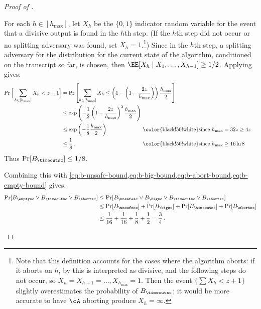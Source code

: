 \begin{itemize}
\begin{itemize}
\begin{proof}[Proof of ]
\begin{itemize}
\begin{itemize}[wide, font=\bfseries]
    For each $h \in [h_{\max}]$, let $X_h$ be the $\{0,1\}$ indicator random
    variable for the event that a divisive output is found in the $h$th step.
    (If the $h$th step did not occur or no splitting adversary was found, set
    $X_h = 1$.\footnote{Note that this definition accounts for the cases where the
    algorithm aborts: if it aborts on $h$, by  this is interpreted
    as divisive, and the following steps do not occur, so $X_h=X_{h+1}=\ldots,X_{h_{\max}}=1$.
    Then the event $\{\sum X_h < z+1\}$ slightly overestimates the probability
    of $B_{\timeoutsc}$; it would be more accurate to have $\cA$ aborting produce 
    $X_h = \infty$.}) Since in the $h$th step, a splitting adversary for the
    distribution for the current state of the algorithm, conditioned on the
    transcript so far, is chosen, then $\EE[X_h \mid X_1,\ldots,X_{h-1}] \ge
    1/2$.
    Applying  gives:
    \begin{align*}
      \Pr\Big[\sum_{h \in [h_{\max}]} X_h < z + 1\Big] &= \Pr\left[\sum_{h \in [h_{\max}]} X_h \le \left(1 - \left(1-\frac{2 z}{h_{\max}} \right) \right)\frac{h_{\max}}{2} \right]\\
        &\le \exp\left( - \frac{1}{2} \left(1-\frac{2 z}{h_{\max}} \right)^2 \frac{h_{\max}}{2}\right) \\
        &\le \exp\left( - \frac{1}{8} \frac{h_{\max}}{2}\right) &&\hspace{-2.5cm}\text{\color{black!50!white}since $h_{\max} = 32 z \ge 4 z$} \\
        &\le \frac{1}{8} \,. &&\hspace{-2.5cm}\text{\color{black!50!white}since $h_{\max} \ge 16 \ln 8$}
    \end{align*}
    Thus $\Pr[B_{\timeoutsc}] \le 1/8$.

    Combining this  with \cref{eq:b-unsafe-bound,eq:b-big-bound,eq:b-abort-bound,eq:b-empty-bound} gives:
    \begin{align}
      \Pr[B_{\emptysc} \lor B_{\timeoutsc} \lor B_{\abortsc}]
        &\le \Pr[B_{\unsafesc} \lor B_{\bigsc} \lor B_{\timeoutsc} \lor B_{\abortsc}] \nonumber\\
        &\le \Pr[B_{\unsafesc}] + \Pr[B_{\bigsc}] + \Pr[B_{\timeoutsc}] + \Pr[B_{\abortsc}] \nonumber\\
        &\le \frac{1}{16} + \frac{1}{16} + \frac{1}{8} + \frac{1}{2} = \frac{3}{4} \,.\label{eq:unsafe-big-fail-abort-bound}
    \end{align}
  

\end{itemize}
\end{itemize}
\end{proof}
\end{itemize}
\end{itemize}
